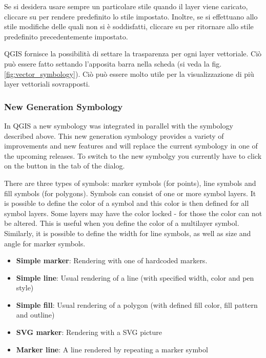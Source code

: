 Se si desidera usare sempre un particolare stile quando il layer viene
caricato, cliccare su  per rendere predefinito
lo stile impostato. Inoltre, se si effettuano allo stile modifiche delle quali
non si è soddisfatti, cliccare su  per
ritornare allo stile predefinito precedentemente impostato.

 \label{sec:vect_transparency} 
QGIS \CURRENT fornisce la possibilità di settare la trasparenza per ogni layer
vettoriale. Ciò può essere fatto settando l'apposita barra
 nella scheda  (si veda la fig. \ref{fig:vector_symbology}).
Ciò può essere molto utile per la visualizzazione di più layer vettoriali
sovrapposti.

\subsubsection{New Generation Symbology}

In QGIS \CURRENT a new symbology was integrated in parallel with the symbology 
described above. This new generation symbology provides a variety of improvements and 
new features and will replace the current symbology in one of the upcoming releases. 
To switch to the new symbolgy you currently have to click on the  button in the  tab of the  dialog.  


There are three types of symbols: marker symbols (for points), line symbols and 
fill symbols (for polygons). Symbols can consist of one or more symbol layers. It 
is possible to define the color of a symbol and this color is then defined for all 
symbol layers. Some layers may have the color locked - for those the color can not 
be altered. This is useful when you define the color of a multilayer symbol. 
Similarly, it is possible to define the width for line symbols, as well as size and 
angle for marker symbols.


\begin{itemize}
\item \textbf{Simple marker}: Rendering with one of hardcoded markers.
\item \textbf{Simple line}: Usual rendering of a line (with specified 
width, color and pen style) 
\item \textbf{Simple fill}: Usual rendering of a polygon (with defined 
fill color, fill pattern and outline) 
\item \textbf{SVG marker}: Rendering with a SVG picture 
\item \textbf{Marker line}: A line rendered by repeating a marker symbol 
\end{itemize}

